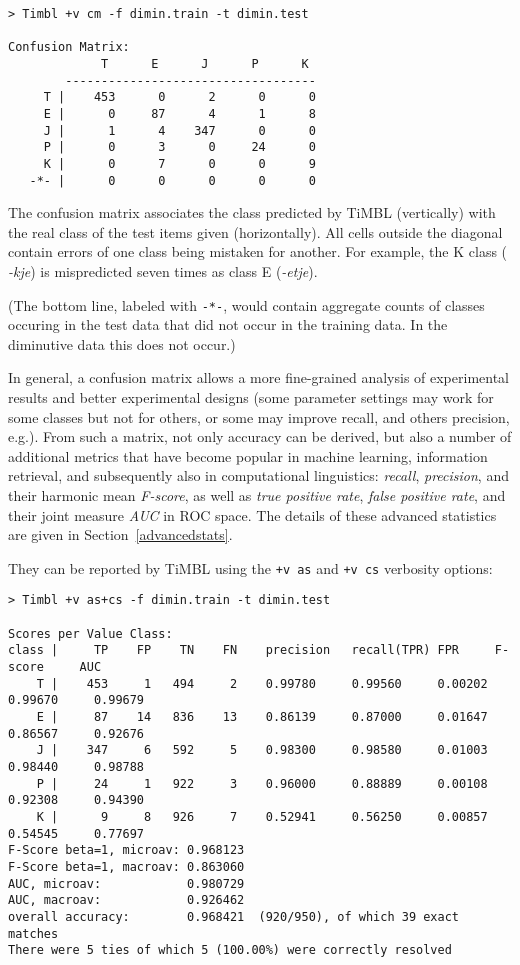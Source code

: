 \documentclass{report}
\begin{document}
{\footnotesize
\begin{verbatim}
> Timbl +v cm -f dimin.train -t dimin.test

Confusion Matrix:
             T      E      J      P      K 
        -----------------------------------
     T |    453      0      2      0      0 
     E |      0     87      4      1      8 
     J |      1      4    347      0      0 
     P |      0      3      0     24      0 
     K |      0      7      0      0      9 
   -*- |      0      0      0      0      0 

\end{verbatim}
}

The confusion matrix associates the class predicted by TiMBL
(vertically) with the real class of the test items given
(horizontally). All cells outside the diagonal contain errors of one
class being mistaken for another. For example, the K class ({\em
  -kje}) is mispredicted seven times as class E ({\em -etje}).

(The bottom line, labeled with {\tt -*-}, would contain aggregate
counts of classes occuring in the test data that did not occur in the
training data. In the diminutive data this does not occur.)

In general, a confusion matrix allows a more fine-grained analysis of
experimental results and better experimental designs (some parameter
settings may work for some classes but not for others, or some may
improve recall, and others precision, e.g.). From such a matrix, not
only accuracy can be derived, but also a number of additional metrics
that have become popular in machine learning, information retrieval,
and subsequently also in computational linguistics: {\em recall},
{\em precision}, and their harmonic mean {\em F-score}, as well as {\em true
  positive rate}, {\em false positive rate}, and their joint measure
{\em AUC} in ROC space.  The details of these advanced statistics are
given in Section~\ref{advancedstats}.

They can be reported by TiMBL using the {\tt +v as} and {\tt +v cs}
verbosity options:

{\footnotesize
\begin{verbatim}
> Timbl +v as+cs -f dimin.train -t dimin.test

Scores per Value Class:
class |     TP    FP    TN    FN	precision	recall(TPR)	FPR		F-score		AUC
    T |    453     1   494     2 	0.99780 	0.99560 	0.00202 	0.99670 	0.99679
    E |     87    14   836    13 	0.86139 	0.87000 	0.01647 	0.86567 	0.92676
    J |    347     6   592     5 	0.98300 	0.98580 	0.01003 	0.98440 	0.98788
    P |     24     1   922     3 	0.96000 	0.88889 	0.00108 	0.92308 	0.94390
    K |      9     8   926     7 	0.52941 	0.56250 	0.00857 	0.54545 	0.77697
F-Score beta=1, microav: 0.968123
F-Score beta=1, macroav: 0.863060
AUC, microav:            0.980729
AUC, macroav:            0.926462
overall accuracy:        0.968421  (920/950), of which 39 exact matches 
There were 5 ties of which 5 (100.00%) were correctly resolved
\end{verbatim}
}
\end{document}
